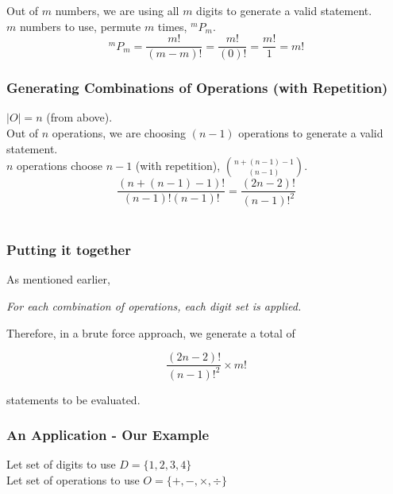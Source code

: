 \documentclass[12pt,a4paper]{article}
\begin{document}

\noindent Out of $m$ numbers, we are using all $m$ digits to generate a valid statement.\\

\noindent $m$ numbers to use, permute $m$ times, $^{m}\!P_{m}$.\\

$$^{m}\!P_{m} = \dfrac{m!}{(m-m)!} = \dfrac{m!}{(0)!} = \dfrac{m!}{1}  = m!$$

\subsubsection*{Generating Combinations of Operations (with Repetition)}
\noindent $|O|  = n$ (from above).\\
 

\noindent Out of $n$ operations, we are choosing $(n - 1)$ operations to generate a valid statement.\\

\noindent $n$ operations choose $n-1$ (with repetition), ${n + (n-1) -1 \choose (n-1)} $.\\

$$\dfrac{(n + (n-1) - 1)!}{(n-1)!(n-1)!} = \dfrac{(2n-2)!}{(n-1)!^2}$$ \\

\subsubsection*{Putting it together}

As mentioned earlier, 

\begin{framed}
\textit{For each combination of operations, each digit set is applied.}
\end{framed}

\noindent Therefore, in a brute force approach, we generate a total of 
\begin{framed}
$$\dfrac{(2n-2)!}{(n-1)!^2} \times m!$$ 
\end{framed}
statements to be evaluated.

\subsubsection*{An Application - Our Example}
Let set of digits to use $D = \lbrace 1, 2, 3, 4 \rbrace$\\
Let set of operations to use $O = \lbrace +, - , \times, \div \rbrace$\\
\end{document}
